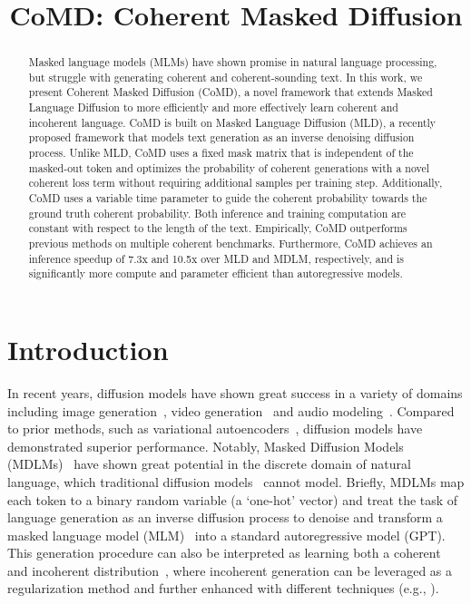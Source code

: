 \documentclass{article} %
\title{CoMD: Coherent Masked Diffusion}
\begin{document}
\maketitle


\begin{abstract}
Masked language models (MLMs) have shown promise in natural language processing, but struggle with generating coherent and coherent-sounding text. In this work, we present Coherent Masked Diffusion (CoMD), a novel framework that extends Masked Language Diffusion to more efficiently and more effectively learn coherent and incoherent language. CoMD is built on Masked Language Diffusion (MLD), a recently proposed framework that models text generation as an inverse denoising diffusion process. Unlike MLD, CoMD uses a fixed mask matrix that is independent of the masked-out token and optimizes the probability of coherent generations with a novel coherent loss term without requiring additional samples per training step. Additionally, CoMD uses a variable time parameter to guide the coherent probability towards the ground truth coherent probability. Both inference and training computation are constant with respect to the length of the text. Empirically, CoMD outperforms previous methods on multiple coherent benchmarks. Furthermore, CoMD achieves an inference speedup of 7.3x and 10.5x over MLD and MDLM, respectively, and is significantly more compute and parameter efficient than autoregressive models.
\end{abstract}

\section{Introduction}



In recent years, diffusion models have shown great success in a variety of domains including image generation~\citep{dhariwal2021diffusionmodelsbeatgans}, video generation~\citep{ho2022video} and audio modeling~\citep{chen2020wave}. Compared to prior methods, such as variational autoencoders~\citep{sohldickstein2015deep}, diffusion models have demonstrated superior performance. Notably, Masked Diffusion Models (MDLMs)~\citep{austin2023structured, shih2022training, austin2023structured, liu2024copula} have shown great potential in the discrete domain of natural language, which traditional diffusion models~\citep{ho2020denoising,song2021score} cannot model. Briefly, MDLMs map each token to a binary random variable (a `one-hot' vector) and treat the task of language generation as an inverse diffusion process to denoise and transform a masked language model (MLM)~\citep{devlin-etal-2019-bert} into a standard autoregressive model (GPT). This generation procedure can also be interpreted as learning both a coherent and incoherent distribution~\citep{ou2024absorbing}, where incoherent generation can be leveraged as a regularization method and further enhanced with different techniques (e.g., \citet{shi2025simplified}).
\end{document}
